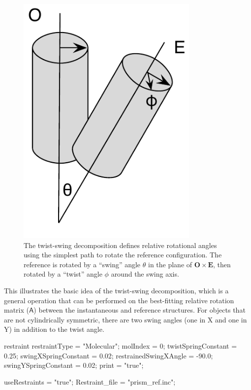 \documentclass[letterpaper]{report}
\begin{document}
\begin{figure}
\includegraphics[width=3.5in]{twistSwing}
\caption[The twist-swing decomposition used in orientational
restraints] {The twist-swing decomposition defines relative rotational
  angles using the simplest path to rotate the reference
  configuration.  The reference is rotated by a ``swing'' angle
  $\theta$ in the plane of $\mathbf{O} \times \mathbf{E}$, then
  rotated by a ``twist'' angle $\phi$ around the swing axis.}
\label{fig:twistSwing}
\end{figure}

This illustrates the basic idea of the twist-swing decomposition,
which is a general operation that can be performed on the best-fitting
relative rotation matrix ($\mathsf{A}$) between the instantaneous and
reference structures.  For objects that are not cylindrically
symmetric, there are two swing angles (one in X and one in Y) in
addition to the twist angle.

\begin{code}[caption={[Specifying Restraints for a Molecule] Sample
    keywords defining a molecular restraint and the associated force constants},label={sch:restMol}] 
restraint{
  restraintType = "Molecular";
  molIndex = 0;
  twistSpringConstant = 0.25;
  swingXSpringConstant = 0.02;
  restrainedSwingXAngle = -90.0;
  swingYSpringConstant = 0.02;
  print = "true";
}

useRestraints = "true";
Restraint_file = "prism_ref.inc";
\end{code}
\end{document}
